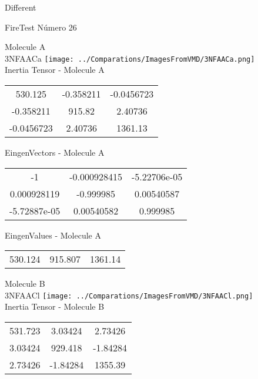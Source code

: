 \begin{center}
\vtab
\vtab
\textcolor{NavyBlue}{\Large Different}
\end{center}

 \newpage

\vtab[-2cm]
\begin{center}
{\large FireTest \tab Número 26}
\end{center}
\begin{multicols}{2}
\begin{center}

Molecule A \\ 
3NFAACa
\texttt{[image: ../Comparations/ImagesFromVMD/3NFAACa.png]}
\\
Inertia Tensor - Molecule A \\
\vtab

\begin{tabular}{|c c c|}
530.125	 & 	-0.358211	 & 	-0.0456723	 \\
-0.358211	 & 	915.82	 & 	2.40736	 \\
-0.0456723	 & 	2.40736	 & 	1361.13
\end{tabular}

\vtab
 EingenVectors - Molecule A     \\
\vtab
\begin{tabular}{|c c c|}
-1	 & 	-0.000928415	 & 	-5.22706e-05	 \\
0.000928119	 & 	-0.999985	 & 	0.00540587	 \\
-5.72887e-05	 & 	0.00540582	 & 	0.999985
\end{tabular}

\vtab
 EingenValues - Molecule A     \\
\vtab
\begin{tabular}{|c c c|}
530.124	 & 	915.807	 & 	1361.14	 \\
\end{tabular}
\columnbreak

Molecule B \\ 
3NFAACl
\texttt{[image: ../Comparations/ImagesFromVMD/3NFAACl.png]}
\\
Inertia Tensor - Molecule B \\
\vtab

\begin{tabular}{|c c c|}
531.723	 & 	3.03424	 & 	2.73426	 \\
3.03424	 & 	929.418	 & 	-1.84284	 \\
2.73426	 & 	-1.84284	 & 	1355.39
\end{tabular}


\end{center}
\end{multicols}
